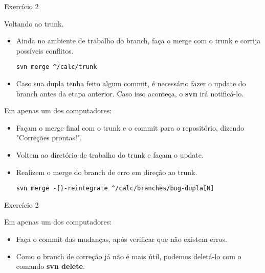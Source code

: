 \documentclass[a4paper]{beamer}
\begin{document}
\begin{frame}[fragile]{Exercício 2}

Voltando ao trunk.
\begin{itemize}
\item Ainda no ambiente de trabalho do branch, faça o merge  com o trunk e corrija possíveis conflitos.
\begin{verbatim}
svn merge ^/calc/trunk
\end{verbatim}
\item Caso sua dupla tenha feito algum commit, é necessário fazer o update do branch antes da etapa anterior. Caso isso aconteça, o \textbf{svn} irá notificá-lo.
\end{itemize}

\pause
Em apenas um dos computadores:
\begin{itemize}
\item Façam o merge final com o trunk e o commit para o repositório, dizendo "Correções prontas!".
\item Voltem ao diretório de trabalho do trunk e façam o update.
\item Realizem o merge do branch de erro em direção ao trunk.
\begin{verbatim}
svn merge -{}-reintegrate ^/calc/branches/bug-dupla[N]
\end{verbatim}
\end{itemize}

\end{frame}

\begin{frame}[fragile]{Exercício 2}

Em apenas um dos computadores:
\begin{itemize}
\item Faça o commit das mudanças, após verificar que não existem erros.
\item Como o branch de correção já não é mais útil, podemos deletá-lo com o comando \textbf{svn delete}.
\end{itemize}

\end{frame}
\end{document}
